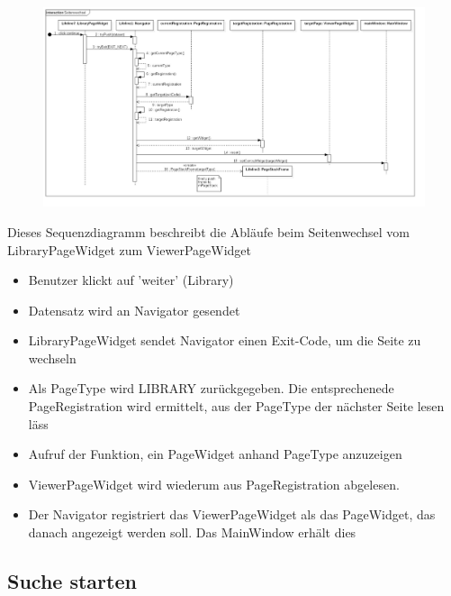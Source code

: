\begin{figure}[H]
\centering
\includegraphics[width=\linewidth]{img/Sequenzdiagramme/Seitenwechsel}
\label{fig:seitenwechsel}
\end{figure}

Dieses Sequenzdiagramm beschreibt die Abläufe beim Seitenwechsel vom LibraryPageWidget zum ViewerPageWidget

\begin{itemize}
	\item Benutzer klickt auf 'weiter' (Library)

	\item Datensatz wird an Navigator gesendet

	\item LibraryPageWidget sendet Navigator einen Exit-Code, um die Seite zu wechseln

	\item Als PageType wird LIBRARY zurückgegeben. Die entsprechenede PageRegistration wird ermittelt, aus der PageType der nächster Seite lesen läss

	\item Aufruf der Funktion, ein PageWidget anhand PageType anzuzeigen

	\item ViewerPageWidget wird wiederum aus PageRegistration abgelesen.

	\item Der Navigator registriert das ViewerPageWidget als das PageWidget, das danach angezeigt werden soll. Das MainWindow erhält dies

\end{itemize}

\pagebreak

\subsection{Suche starten}

